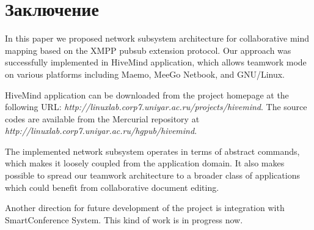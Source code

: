\newpage

\chapter*{Заключение}


In this paper we proposed network subsystem architecture for collaborative mind
mapping based on the XMPP pubsub extension protocol. Our approach was
successfully implemented in HiveMind application, which allows teamwork mode on
various platforms including Maemo, MeeGo Netbook, and GNU/Linux.

HiveMind application can be downloaded from the project homepage at the
following URL: \emph{http://linuxlab.corp7.uniyar.ac.ru/projects/hivemind}. The
source codes are available from the Mercurial repository at
\emph{http://linuxlab.corp7.uniyar.ac.ru/hgpub/hivemind}.

The implemented network subsystem operates in terms of abstract commands, which
makes it loosely coupled from the application domain. It also makes possible to
spread our teamwork architecture to a broader class of applications which could
benefit from collaborative document editing.

Another direction for future development of the project is integration with
SmartConference System. This kind of work is in progress now.
